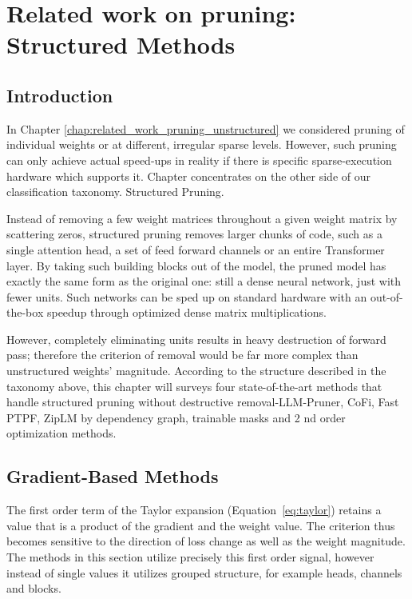 \providecommand{\methoddetail}[1]{}
\providecommand{\methodsep}{}
\chapter{Related work on pruning: Structured Methods}
\label{chap:related_work_pruning_structured}


\section{Introduction}
In Chapter \ref{chap:related_work_pruning_unstructured} we considered pruning of individual weights or at different, irregular sparse levels. However, such pruning can only achieve actual speed-ups in reality if there is specific sparse-execution hardware which supports it. Chapter concentrates on the other side of our classification taxonomy. Structured Pruning.

Instead of removing a few weight matrices throughout a given weight matrix by scattering zeros, structured pruning removes larger chunks of code, such as a single attention head, a set of feed forward channels or an entire Transformer layer. By taking such building blocks out of the model, the pruned model has exactly the same form as the original one: still a dense neural network, just with fewer units. Such networks can be sped up on standard hardware with an out-of-the-box speedup through optimized dense matrix multiplications.

However, completely eliminating units results in heavy destruction of forward pass; therefore the criterion of removal would be far more complex than unstructured weights' magnitude. According to the structure described in the taxonomy above, this chapter will surveys four state-of-the-art methods that handle structured pruning without destructive removal-LLM-Pruner, CoFi, Fast PTPF, ZipLM by dependency graph, trainable masks and 2 nd order optimization methods.
\section{Gradient-Based Methods}

The first order term of the Taylor expansion (Equation~\eqref{eq:taylor}) retains a value that is a product of the gradient and the weight value. The criterion thus becomes sensitive to the direction of loss change as well as the weight magnitude. The methods in this section utilize precisely this first order signal, however instead of single values it utilizes grouped structure, for example heads, channels and blocks.

